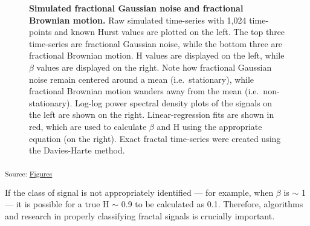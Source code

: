 \documentclass[
  sn-vancouver,
  Numbered,
  referee,
  lineno]{sn-jnl}
\begin{document}
\begin{figure}[H]


\caption{\label{fig-typicalsamplepaths}\textbf{Simulated fractional
Gaussian noise and fractional Brownian motion.} Raw simulated
time-series with 1,024 time-points and known Hurst values are plotted on
the left. The top three time-series are fractional Gaussian noise, while
the bottom three are fractional Brownian motion. H values are displayed
on the left, while \(\beta\) values are displayed on the right. Note how
fractional Gaussian noise remain centered around a mean
(i.e.~stationary), while fractional Brownian motion wanders away from
the mean (i.e.~non-stationary). Log-log power spectral density plots of
the signals on the left are shown on the right. Linear-regression fits
are shown in red, which are used to calculate \(\beta\) and H using the
appropriate equation (on the right). Exact fractal time-series were
created using the Davies-Harte method.}

\end{figure}%

\textsubscript{Source:
\href{https://WeberLab.github.io/Hurst_LitReview/notebooks/Figures-preview.html\#cell-fig-typicalsamplepaths}{Figures}}

If the class of signal is not appropriately identified --- for example,
when \(\beta\) is \(\sim\) 1 --- it is possible for a true H \(\sim\)
0.9 to be calculated as 0.1. Therefore, algorithms and research in
properly classifying fractal signals is crucially important.
\end{document}
